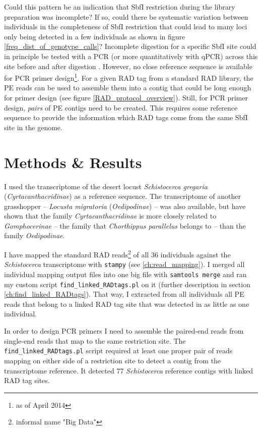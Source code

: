 \documentclass[a4paper,12pt,times,print,index,custombib,custommargin]{PhDThesisPSnPDF}\usepackage[]{graphicx}\usepackage[]{color}
\begin{document}
Could this pattern be an indication that SbfI restriction during the library preparation was incomplete? If so, could there be systematic variation between individuals  in the completeness of SbfI restriction that could lead to many loci only being detected in a few individuals as shown in figure \ref{freq_dist_of_genotype_calls}?
Incomplete digestion for a specific SbfI site could in principle be tested with a PCR (or more quantitatively with qPCR) across this site before and after digestion \citep{Luca2011}. However, no close reference sequence is available for PCR primer design\footnote{as of April 2014}. For a given \gls{RAD tag} from a standard RAD library, the PE reads can be used to assemble them into a \gls{contig} that could be long enough for primer design (see figure \ref{RAD_protocol_overview}).
Still, for PCR primer design, \emph{pairs} of PE \glspl{contig} need to be created. This requires some reference sequence to provide the information which \glspl{RAD tag} come from the same SbfI site in the genome.


\section{Methods \& Results}

I used the transcriptome of the desert locust \textit{Schistocerca gregaria} (\textit{Cyrtacanthacridinae}) \citep{Badisco2011} as a reference sequence. The transcriptome of another grasshopper -- \textit{Locusta migratoria} (\textit{Oedipodinae}) \citep{Kang2004} -- was also available, but \cite{Liu2008a} have shown that the family \textit{Cyrtacanthacridinae} is more closely related to \textit{Gomphocerinae} -- the family that \textit{Chorthippus parallelus} belongs to -- than the family \textit{Oedipodinae}.

I have mapped the standard RAD reads\footnote{informal name "Big Data"} of all 36 individuals against the \textit{Schistocerca} transcriptome with \texttt{stampy} \citep{Lunter2011} (see \vref{ch:read_mapping}). I merged all individual mapping output files into one big file with \texttt{samtools merge} and ran my custom script \texttt{find\_linked\_RADtags.pl} on it (further description in section \ref{ch:find_linked_RADtags}). That way, I extracted from all individuals all PE reads that belong to a \gls{linked RAD tag site} that was detected in as little as one individual.

In order to design PCR primers I need to assemble the paired-end reads from single-end reads that map to the same restriction site. The \texttt{find\_linked\_RADtags.pl} script required at least one \gls{proper pair} of reads mapping on either side of a restriction site to detect a contig from the transcriptome reference. It detected 77 \textit{Schistocerca} reference contigs with \glspl{linked RAD tag site}.
\end{document}
